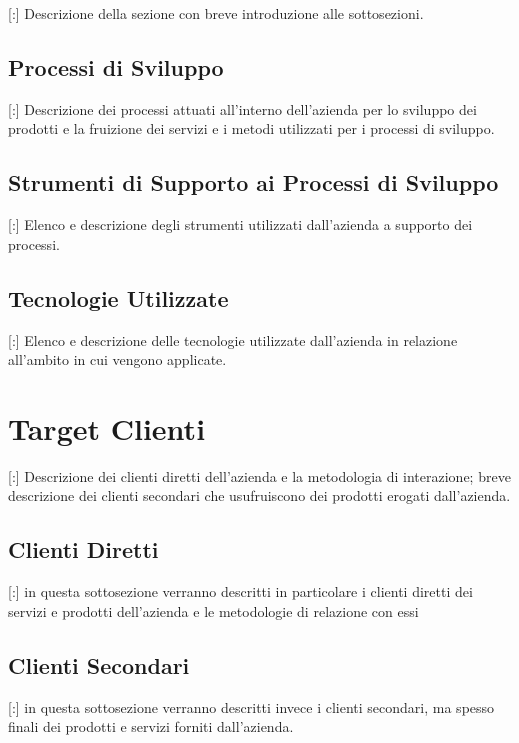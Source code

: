 \documentclass[11pt]{book}              %
\begin{document}
[:] Descrizione della sezione con breve introduzione alle sottosezioni.

\subsection{Processi di Sviluppo}

[:] Descrizione dei processi attuati all'interno dell'azienda per lo sviluppo dei prodotti e la fruizione dei servizi e i metodi utilizzati per i processi di sviluppo.

\subsection{Strumenti di Supporto ai Processi di Sviluppo}

[:] Elenco e descrizione degli strumenti utilizzati dall'azienda a supporto dei processi.

\subsection{Tecnologie Utilizzate}

[:] Elenco e descrizione delle tecnologie utilizzate dall'azienda in relazione all'ambito in cui vengono applicate.

\section{Target Clienti}

[:] Descrizione dei clienti diretti dell'azienda e la metodologia di interazione; breve descrizione dei clienti secondari che usufruiscono dei prodotti erogati dall'azienda.

\subsection{Clienti Diretti}

[:] in questa sottosezione verranno descritti in particolare i clienti diretti dei servizi e prodotti dell'azienda e le metodologie di relazione con essi

\subsection{Clienti Secondari}

[:] in questa sottosezione verranno descritti invece i clienti secondari, ma spesso finali dei prodotti e servizi forniti dall'azienda.
\end{document}
